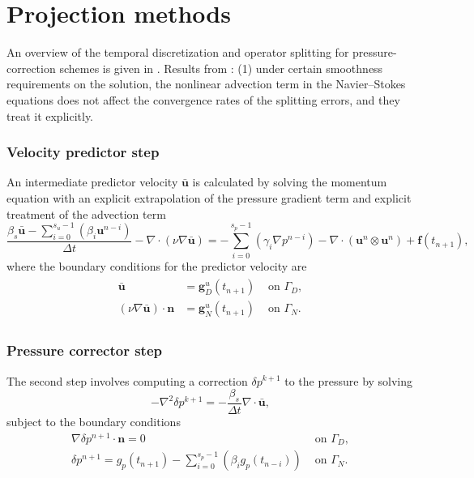 \section{Projection methods}%
\label{sec:temporal_discretization}

An overview of the temporal discretization and operator splitting for pressure-correction schemes is given in \cite{guermond_overview_2006}. Results from \cite{guermond_overview_2006}: (1) under certain smoothness requirements on the solution, the nonlinear advection term in the Navier--Stokes equations does not affect the convergence rates of the splitting errors, and they treat it explicitly. 

\subsubsection{Velocity predictor step}
An intermediate predictor velocity $\bar{\bm{u}}$ is calculated by solving the momentum equation with an explicit extrapolation of the pressure gradient term and explicit treatment of the advection term
\begin{equation}
\frac{ \beta_s \bar{\bm{u}} - \sum_{i=0}^{s_u-1}\left(\beta_i \bm{u}^{n-i}\right) }{\Delta t} 
- \nabla \cdot \left(\nu \nabla \bar{\bm{u}}\right) 
= - \sum_{i=0}^{s_p-1}\left(\gamma_i\nabla p^{n-i}\right) 
- \nabla \cdot \left(\bm{u}^n\otimes \bm{u}^n\right) 
+ \bm{f}(t_{n+1}),
\label{eq:PDE_velocity_predictor}
\end{equation}
where the boundary conditions for the predictor velocity are 
\begin{align}
  \begin{aligned}
  \bar{\bm{u}} &= \bm{g}_D^u(t_{n+1}) & \text{ on } \Gamma_D, \\
  \left(\nu \nabla \bar{\bm{u}}\right) \cdot \bm{n} &= \bm{g}_N^u(t_{n+1}) & \text{ on } \Gamma_N.
  \end{aligned}
  \label{eq:VP_BCs}
\end{align}

\subsubsection{Pressure corrector step}
The second step involves computing a correction $\delta p^{k+1}$ to the pressure by solving 
\begin{equation}
  -\nabla^2 \delta p^{k+1} = - \frac{\beta_s}{\Delta t} \nabla \cdot \bar{\bm{u}},
  \label{eq:PC_presure_poisson}
\end{equation}
subject to the boundary conditions
\begin{eqnarray}
    \nabla \delta p^{n+1} \cdot \bm{n} = 0 & \text{ on } \Gamma_D, \\
    \delta p^{n+1} = g_p(t_{n+1}) 
    - \sum_{i=0}^{s_p-1}\left(\beta_i g_p(t_{n-i})\right) & \text{ on }  \Gamma_N.
\label{eq:PDE_pressure_corrector}
\end{eqnarray}

